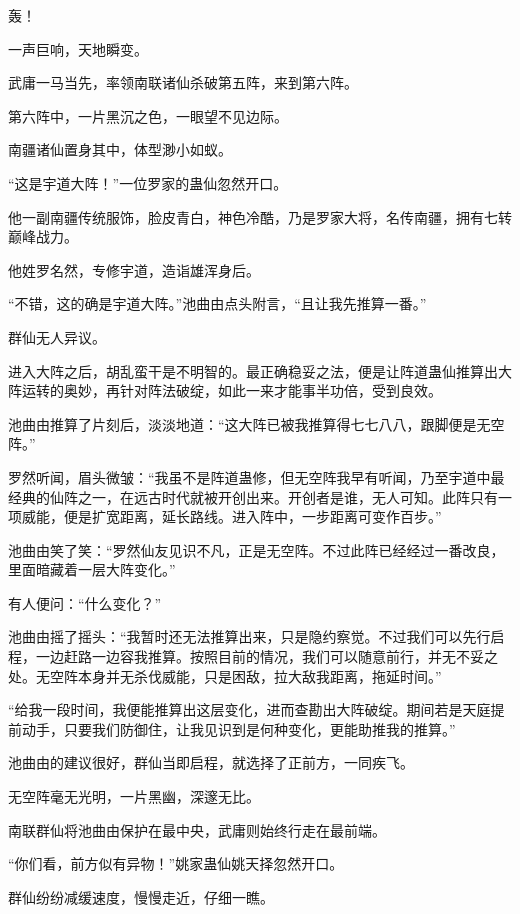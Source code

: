 
\begin{this_body}

轰！

一声巨响，天地瞬变。

武庸一马当先，率领南联诸仙杀破第五阵，来到第六阵。

第六阵中，一片黑沉之色，一眼望不见边际。

南疆诸仙置身其中，体型渺小如蚁。

“这是宇道大阵！”一位罗家的蛊仙忽然开口。

他一副南疆传统服饰，脸皮青白，神色冷酷，乃是罗家大将，名传南疆，拥有七转巅峰战力。

他姓罗名然，专修宇道，造诣雄浑身后。

“不错，这的确是宇道大阵。”池曲由点头附言，“且让我先推算一番。”

群仙无人异议。

进入大阵之后，胡乱蛮干是不明智的。最正确稳妥之法，便是让阵道蛊仙推算出大阵运转的奥妙，再针对阵法破绽，如此一来才能事半功倍，受到良效。

池曲由推算了片刻后，淡淡地道：“这大阵已被我推算得七七八八，跟脚便是无空阵。”

罗然听闻，眉头微皱：“我虽不是阵道蛊修，但无空阵我早有听闻，乃至宇道中最经典的仙阵之一，在远古时代就被开创出来。开创者是谁，无人可知。此阵只有一项威能，便是扩宽距离，延长路线。进入阵中，一步距离可变作百步。”

池曲由笑了笑：“罗然仙友见识不凡，正是无空阵。不过此阵已经经过一番改良，里面暗藏着一层大阵变化。”

有人便问：“什么变化？”

池曲由摇了摇头：“我暂时还无法推算出来，只是隐约察觉。不过我们可以先行启程，一边赶路一边容我推算。按照目前的情况，我们可以随意前行，并无不妥之处。无空阵本身并无杀伐威能，只是困敌，拉大敌我距离，拖延时间。”

“给我一段时间，我便能推算出这层变化，进而查勘出大阵破绽。期间若是天庭提前动手，只要我们防御住，让我见识到是何种变化，更能助推我的推算。”

池曲由的建议很好，群仙当即启程，就选择了正前方，一同疾飞。

无空阵毫无光明，一片黑幽，深邃无比。

南联群仙将池曲由保护在最中央，武庸则始终行走在最前端。

“你们看，前方似有异物！”姚家蛊仙姚天择忽然开口。

群仙纷纷减缓速度，慢慢走近，仔细一瞧。


\end{this_body}

